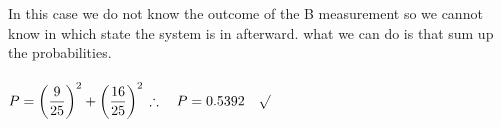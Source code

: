 \documentclass[fleqn]{article}
\begin{document}
\begin{itemize}
      \textcolor{hwColor}{
        In this case we do not know the outcome of the B measurement so we cannot know in which state 
        the system is in afterward. what we can do is that sum up the probabilities.
        \\
        \\
        $
          P=\left(\dfrac{9}{25}\right)^2+\left(\dfrac{16}{25}\right)^2 \\
          \\
          \\
          \therefore ~~~ P=0.5392  ~~~ \surd 
        $
      }
    
  \end{itemize}
\end{document}
